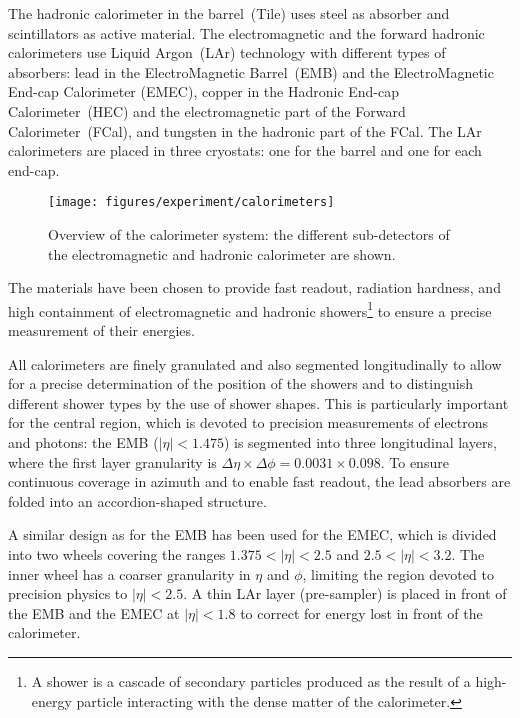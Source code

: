 The hadronic calorimeter in the barrel~(Tile) uses steel as absorber
and scintillators as active material.
The electromagnetic and the forward hadronic calorimeters use Liquid
Argon~(LAr) technology with different types of absorbers:
lead in the ElectroMagnetic Barrel~(EMB) and the ElectroMagnetic
End-cap Calorimeter (EMEC), copper in the Hadronic End-cap
Calorimeter~(HEC) and the electromagnetic part of the Forward Calorimeter~(FCal),
and tungsten in the hadronic part of the FCal.
The LAr calorimeters are placed in three cryostats: one for the barrel and one for each end-cap.

\begin{figure}[ht]
\begin{center}
\texttt{[image: figures/experiment/calorimeters]}
\caption[Overview of the calorimeter system]{
  Overview of the calorimeter system:
  the different sub-detectors of the electromagnetic and hadronic calorimeter are shown.}
\label{fig:calorimeters}
\end{center}
\end{figure}

The materials have been chosen to provide fast readout, 
radiation hardness, and high containment of electromagnetic and
hadronic showers\footnote{A shower is a cascade of secondary particles produced 
as the result of a high-energy particle interacting with the dense matter of the calorimeter.} 
to ensure a precise measurement of their energies.

All calorimeters are finely granulated and also segmented
longitudinally to allow for a precise determination of the position of the showers and to
distinguish different shower types by the use of shower shapes.
This is particularly important for the central region, 
which is devoted to precision measurements of electrons and photons:
the EMB (\mbox{$|\eta| < 1.475$}) is segmented into three longitudinal
layers, where the first layer granularity is
$\Delta\eta\times\Delta\phi=0.0031\times0.098$. 
To ensure continuous coverage in azimuth and to enable fast readout, 
the lead absorbers are folded into an accordion-shaped structure.

A similar design as for the EMB has been used for the EMEC, 
which is divided into two wheels covering the ranges \mbox{$1.375 < |\eta| < 2.5$}
and \mbox{$2.5 < |\eta| < 3.2$}.
The inner wheel has a coarser granularity in $\eta$ and $\phi$, 
limiting the region devoted to precision physics to \mbox{$|\eta| < 2.5$}.
A thin LAr layer (pre-sampler) is placed in front of the EMB and the
EMEC at \mbox{$|\eta| < 1.8$} to correct for energy lost in front of the calorimeter.

